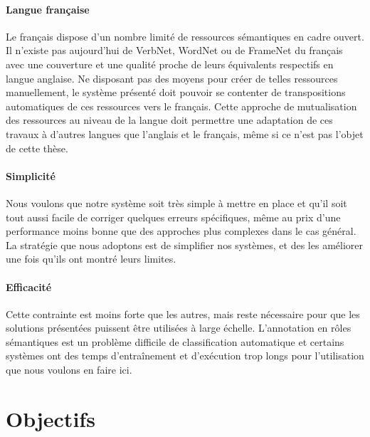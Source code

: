 \paragraph{Langue française} Le français dispose d'un nombre limité de
ressources sémantiques en cadre ouvert. Il n'existe pas aujourd'hui de VerbNet,
WordNet ou de FrameNet du français avec une couverture et une qualité proche de
leurs équivalents respectifs en langue anglaise. Ne disposant pas des moyens
pour créer de telles ressources manuellement, le système présenté doit pouvoir
se contenter de transpositions automatiques de ces ressources vers le français.
Cette approche de mutualisation des ressources au niveau de la langue doit
permettre une adaptation de ces travaux à d'autres langues que l'anglais et le
français, même si ce n'est pas l'objet de cette thèse.

\paragraph{Simplicité} Nous voulons que notre système soit très simple à mettre
en place et qu'il soit tout aussi facile de corriger quelques erreurs
spécifiques, même au prix d'une performance moins bonne que des approches plus
complexes dans le cas général. La stratégie que nous adoptons est de simplifier
nos systèmes, et des les améliorer une fois qu'ils ont montré leurs limites.

\paragraph{Efficacité} Cette contrainte est moins forte que les autres, mais
reste nécessaire pour que les solutions présentées puissent être utilisées à
large échelle. L'annotation en rôles sémantiques est un problème difficile de
classification automatique et certains systèmes ont des temps d'entraînement et
d'exécution trop longs pour l'utilisation que nous voulons en faire ici.

\section{Objectifs}
\label{objectifs_these}

